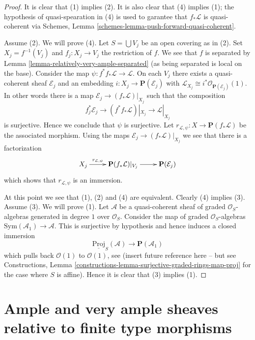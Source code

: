 \begin{proof}
It is clear that (1) implies (2). It is also clear that
(4) implies (1); the hypothesis of quasi-spearation
in (4) is used to garantee that $f_*\mathcal{L}$ is quasi-coherent via
Schemes, Lemma \ref{schemes-lemma-push-forward-quasi-coherent}.

\medskip\noindent
Assume (2).
We will prove (4).
Let $S = \bigcup V_j$ be an open covering as in (2).
Set $X_j = f^{-1}(V_j)$ and $f_j : X_j \to V_j$ the
restriction of $f$. We see that $f$ is separated by
Lemma \ref{lemma-relatively-very-ample-separated} (as being
separated is local on the base). Consider the map
$\psi : f^*f_*\mathcal{L} \to \mathcal{L}$. On each $V_j$ there exists a
quasi-coherent sheaf $\mathcal{E}_j$ and an embedding
$i : X_j \to \mathbf{P}(\mathcal{E}_j)$ with
$\mathcal{L}_{X_j} \cong i^*\mathcal{O}_{\mathbf{P}(\mathcal{E}_j)}(1)$.
In other words there is a map $\mathcal{E}_j \to (f_*\mathcal{L})|_{X_j}$
such that the composition
$$
f_j^*\mathcal{E}_j \to (f^*f_*\mathcal{L})|_{X_j} \to \mathcal{L}|_{X_j}
$$
is surjective. Hence we conclude that $\psi$ is surjective. Let
$r_{\mathcal{L}, \psi} : X \to \mathbf{P}(f_*\mathcal{L})$ be the
associated morphism.
Using the maps $\mathcal{E}_j \to (f_*\mathcal{L})|_{X_j}$
we see that there is a factorization
$$
\xymatrix{
X_j \ar[r]^-{r_{\mathcal{L}, \psi}} &
\mathbf{P}(f_*\mathcal{L})|_{V_j} \ar[r] &
\mathbf{P}(\mathcal{E}_j)
}
$$
which shows that $r_{\mathcal{L}, \psi}$ is an immersion.

\medskip\noindent
At this point we see that (1), (2) and (4) are equivalent.
Clearly (4) implies (3). Assume (3). We will prove (1).
Let $\mathcal{A}$ be a quasi-coherent sheaf of graded $\mathcal{O}_S$-algebras
generated in degree $1$ over $\mathcal{O}_S$. Consider the map of
graded $\mathcal{O}_S$-algebras $\text{Sym}(\mathcal{A}_1) \to \mathcal{A}$.
This is surjective by hypothesis and hence induces a closed immersion
$$
\underline{\text{Proj}}_S(\mathcal{A})
\longrightarrow
\mathbf{P}(\mathcal{A}_1)
$$
which pulls back $\mathcal{O}(1)$ to $\mathcal{O}(1)$,
see (insert future reference here -- but see
Constructions, Lemma \ref{constructions-lemma-surjective-graded-rings-map-proj}
for the case where $S$ is affine). Hence it is clear that
(3) implies (1).
\end{proof}






\section{Ample and very ample sheaves relative to finite type morphisms}
\label{section-ample-finite-type}

